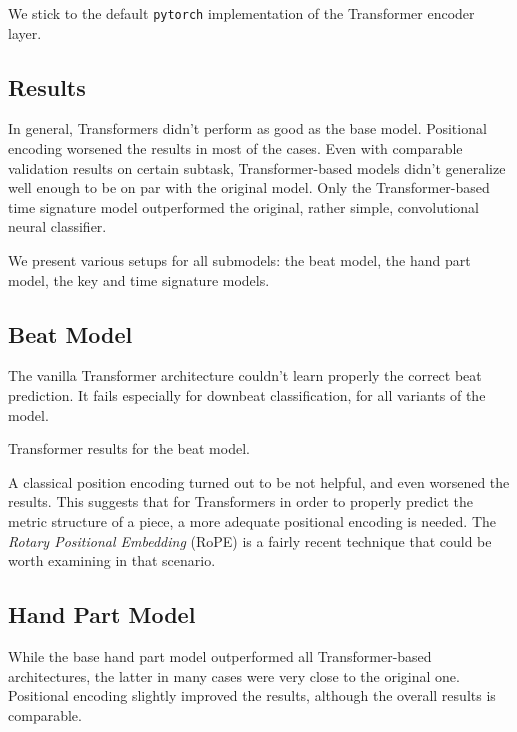 We stick to the default \texttt{pytorch} implementation of the Transformer encoder layer.

\subsection{Results}

In general, Transformers didn't perform as good as the base model. Positional encoding worsened the results in most of the cases. Even with comparable validation results on certain subtask, Transformer-based models didn't generalize well enough to be on par with the original model. Only the Transformer-based time signature model outperformed the original, rather simple, convolutional neural classifier.

We present various setups for all submodels: the beat model, the hand part model, the key and time signature models.

\subsection{Beat Model}

The vanilla Transformer architecture couldn't learn properly the correct beat prediction. It fails especially for downbeat classification, for all variants of the model.

\begin{table}[ht!]
\centering

\caption[Transformer results for the beat model.]{Transformer results for the beat model.}
\label{beat_transformer}
\end{table}

A classical position encoding turned out to be not helpful, and even worsened the results. This suggests that for Transformers in order to properly predict the metric structure of a piece, a more adequate positional encoding is needed. The \emph{Rotary Positional Embedding} (RoPE) \cite{Su2024} is a fairly recent technique that could be worth examining in that scenario.

\subsection{Hand Part Model}

While the base hand part model outperformed all Transformer-based architectures, the latter in many cases were very close to the original one. Positional encoding slightly improved the results, although the overall results is comparable.

